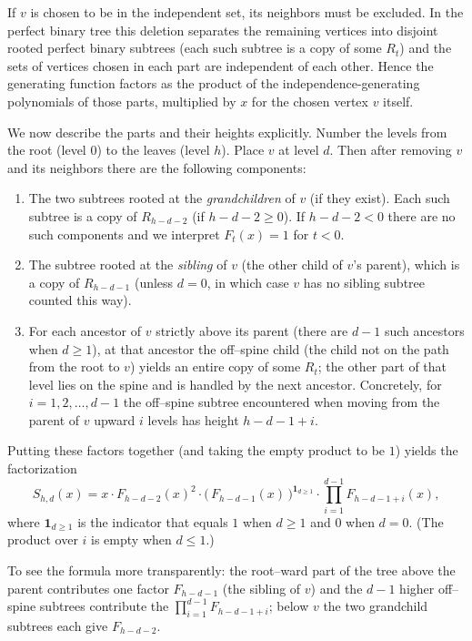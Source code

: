 \documentclass[11pt]{article}
\begin{document}
If $v$ is chosen to be in the independent set, its neighbors must be excluded. In the perfect binary tree this deletion separates the remaining vertices into disjoint rooted perfect binary subtrees (each such subtree is a copy of some $R_t$) and the sets of vertices chosen in each part are independent of each other. Hence the generating function factors as the product of the independence-generating polynomials of those parts, multiplied by $x$ for the chosen vertex $v$ itself.

We now describe the parts and their heights explicitly. Number the levels from the root (level $0$) to the leaves (level $h$). Place $v$ at level $d$. Then after removing $v$ and its neighbors there are the following components:
\begin{enumerate}[leftmargin=*,nosep]
	\item The two subtrees rooted at the \emph{grandchildren} of $v$ (if they exist). Each such subtree is a copy of $R_{h-d-2}$ (if $h-d-2\ge0$). If $h-d-2<0$ there are no such components and we interpret $F_t(x)=1$ for $t<0$.
	\item The subtree rooted at the \emph{sibling} of $v$ (the other child of $v$'s parent), which is a copy of $R_{h-d-1}$ (unless $d=0$, in which case $v$ has no sibling subtree counted this way).
	\item For each ancestor of $v$ strictly above its parent (there are $d-1$ such ancestors when $d\ge1$), at that ancestor the off--spine child (the child not on the path from the root to $v$) yields an entire copy of some $R_t$; the other part of that level lies on the spine and is handled by the next ancestor. Concretely, for $i=1,2,\dots,d-1$ the off--spine subtree encountered when moving from the parent of $v$ upward $i$ levels has height $h-d-1+i$.
\end{enumerate}

Putting these factors together (and taking the empty product to be $1$) yields the factorization
\begin{equation}\label{eq:Shd}
	S_{h,d}(x)=x\cdot F_{h-d-2}(x)^2\cdot\bigl(\,F_{h-d-1}(x)\,\bigr)^{\mathbf{1}_{d\ge1}}\cdot\prod_{i=1}^{d-1} F_{h-d-1+i}(x),
\end{equation}
where $\mathbf{1}_{d\ge1}$ is the indicator that equals $1$ when $d\ge1$ and $0$ when $d=0$. (The product over $i$ is empty when $d\le1$.)

To see the formula more transparently: the root--ward part of the tree above the parent contributes one factor $F_{h-d-1}$ (the sibling of $v$) and the $d-1$ higher off--spine subtrees contribute the $\prod_{i=1}^{d-1}F_{h-d-1+i}$; below $v$ the two grandchild subtrees each give $F_{h-d-2}$.
\end{document}
